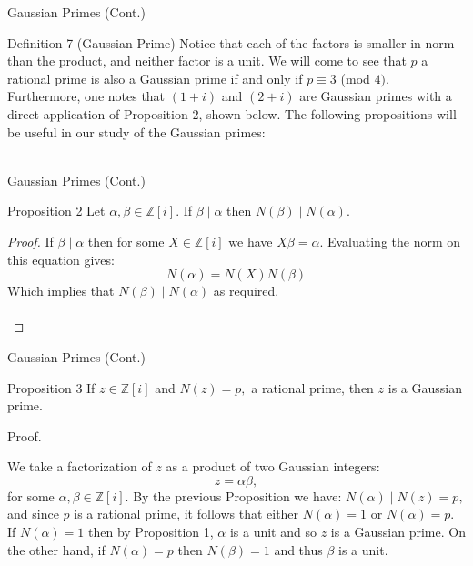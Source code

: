 \begin{frame}{Gaussian Primes (Cont.)}
    \begin{block}{Definition 7 (Gaussian Prime)}
    Notice that each of the factors is smaller in norm than the product, and neither factor is a unit. We will come to see that $p$ a rational prime is also a Gaussian prime if and only if $p\equiv 3$ (mod $4).$ Furthermore, one notes that $(1+i)$ and $(2+i)$ are Gaussian primes with a direct application of Proposition 2, shown below. 
The following propositions will be useful in our study of the Gaussian primes:\\\\
    \end{block}
\end{frame}


\begin{frame}{Gaussian Primes (Cont.)}
    \begin{block}{Proposition 2}
        Let $\alpha,\beta \in\mathbb{Z}[i].$ If $\beta \mid \alpha$ then $N(\beta)\mid N(\alpha).$\\
    \end{block}
    \begin{proof}
        If $\beta \mid \alpha$ then for some $X\in\mathbb{Z}[i]$ we have $X\beta=\alpha.$ Evaluating the norm on this equation gives:
$$N(\alpha)=N(X)N(\beta)$$
Which implies that $N(\beta)\mid N(\alpha)$ as required. \\\\
    \end{proof}
\end{frame}


\begin{frame}{Gaussian Primes (Cont.)}
    \begin{block}{Proposition 3}
        If $z\in\mathbb{Z}[i]$ and $N(z)=p,$ a rational prime, then $z$ is a Gaussian prime.\\
    \end{block}
    \begin{block}{Proof.}
        \begin{proofs}
        We take a factorization of $z$ as a product of two Gaussian integers:
$$z=\alpha \beta,$$
for some $\alpha,\beta \in\mathbb{Z}[i].$ By the previous Proposition we have: $N(\alpha)\mid N(z)=p,$ and since $p$ is a rational prime, it follows that either $N(\alpha)=1$ or $N(\alpha)=p.$ If $N(\alpha)=1$ then by Proposition 1, $\alpha$ is a unit and so $z$ is a Gaussian prime. On the other hand, if $N(\alpha)=p$ then $N(\beta)=1$ and thus $\beta$ is a unit. 
    \end{proofs}
    \end{block}
\end{frame}


